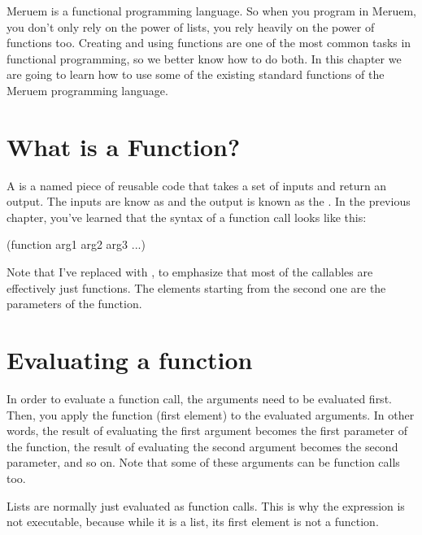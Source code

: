 Meruem is a functional programming language. So when you program in Meruem, you don't only rely on the power of lists, you rely heavily on the power of functions too. Creating and using functions are one of the most common tasks in functional programming, so we better know how to do both. In this chapter we are going to learn how to use some of the existing standard functions of the Meruem programming language.

\section{What is a Function?}
A  is a named piece of reusable code that takes a set of inputs and return an output. The inputs are know as  and the output is known as the . In the previous chapter, you've learned that the syntax of a function call looks like this:

\begin{QuasiLang}
(function arg1 arg2 arg3 ...)
\end{QuasiLang}

Note that I've replaced  with , to emphasize that most of the callables are effectively just functions. The elements starting from the second one are the parameters of the function. 

\section{Evaluating a function}
In order to evaluate a function call, the arguments need to be evaluated first. Then, you apply the function (first element) to the evaluated arguments. In other words, the result of evaluating the first argument becomes the first parameter of the function, the result of evaluating the second argument becomes the second parameter, and so on. Note that some of these arguments can be function calls too.

Lists are normally just evaluated as function calls. This is why the expression  is not executable, because while it is a list, its first element is not a function.